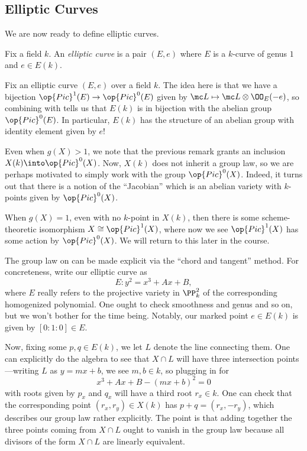 \documentclass[../notes.tex]{subfiles}
\begin{document}
\subsection{Elliptic Curves}
We are now ready to define elliptic curves.
\begin{definition}
	Fix a field $k$. An \textit{elliptic curve} is a pair $(E,e)$ where $E$ is a $k$-curve of genus $1$ and $e\in E(k)$.
\end{definition}
\begin{remark} \label{rem:group-law-ec}
	Fix an elliptic curve $(E,e)$ over a field $k$. The idea here is that we have a bijection $\op{Pic}^1(E)\to\op{Pic}^0(E)$ given by $\mc L\mapsto\mc L\otimes\OO_E(-e)$, so combining with  tells us that $E(k)$ is in bijection with the abelian group $\op{Pic}^0(E)$. In particular, $E(k)$ has the structure of an abelian group with identity element given by $e$!
\end{remark}
\begin{remark}
	Even when $g(X)>1$, we note that the previous remark grants an inclusion $X(k)\into\op{Pic}^0(X)$. Now, $X(k)$ does not inherit a group law, so we are perhaps motivated to simply work with the group $\op{Pic}^0(X)$. Indeed, it turns out that there is a notion of the ``Jacobian'' which is an abelian variety with $k$-points given by $\op{Pic}^0(X)$.
\end{remark}
\begin{remark}
	When $g(X)=1$, even with no $k$-point in $X(k)$, then there is some scheme-theoretic isomorphism $X\cong\op{Pic}^1(X)$, where now we see $\op{Pic}^1(X)$ has some action by $\op{Pic}^0(X)$. We will return to this later in the course.
\end{remark}
The group law on  can be made explicit via the ``chord and tangent'' method. For concreteness, write our elliptic curve as
\[E\colon y^2=x^3+Ax+B,\]
where $E$ really refers to the projective variety in $\PP^2_k$ of the corresponding homogenized polynomial. One ought to check smoothness and genus and so on, but we won't bother for the time being. Notably, our marked point $e\in E(k)$ is given by $[0:1:0]\in E$.

Now, fixing some $p,q\in E(k)$, we let $L$ denote the line connecting them. One can explicitly do the algebra to see that $X\cap L$ will have three intersection points---writing $L$ as $y=mx+b$, we see $m,b\in k$, so plugging in for
\[x^3+Ax+B-(mx+b)^2=0\]
with roots given by $p_x$ and $q_x$ will have a third root $r_x\in k$. One can check that the corresponding point $(r_x,r_y)\in X(k)$ has $p+q=(r_x,-r_y)$, which describes our group law rather explicitly. The point is that adding together the three points coming from $X\cap L$ ought to vanish in the group law because all divisors of the form $X\cap L$ are linearly equivalent.
\end{document}
